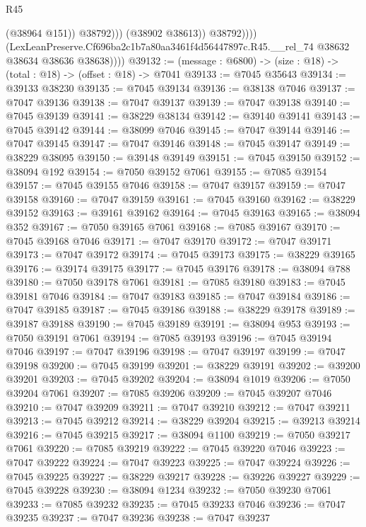 \begin{lexlean}{R45}
\begin{coremodule}
{                            (@38964 @151))
                          @38792)))
                    (@38902 @38613))
                  @38792))))
          (LexLeanPreserve.Cf696ba2c1b7a80aa3461f4d56447897c.R45.__rel_74
            @38632
            @38634
            @38636
            @38638))))
@39132 := (message : @6800) -> (size : @18) -> (total : @18) -> (offset : @18) -> @7041
@39133 := @7045 @35643
@39134 := @39133 @38230
@39135 := @7045 @39134
@39136 := @38138 @7046
@39137 := @7047 @39136
@39138 := @7047 @39137
@39139 := @7047 @39138
@39140 := @7045 @39139
@39141 := @38229 @38134
@39142 := @39140 @39141
@39143 := @7045 @39142
@39144 := @38099 @7046
@39145 := @7047 @39144
@39146 := @7047 @39145
@39147 := @7047 @39146
@39148 := @7045 @39147
@39149 := @38229 @38095
@39150 := @39148 @39149
@39151 := @7045 @39150
@39152 := @38094 @192
@39154 := @7050 @39152 @7061
@39155 := @7085 @39154
@39157 := @7045 @39155 @7046
@39158 := @7047 @39157
@39159 := @7047 @39158
@39160 := @7047 @39159
@39161 := @7045 @39160
@39162 := @38229 @39152
@39163 := @39161 @39162
@39164 := @7045 @39163
@39165 := @38094 @352
@39167 := @7050 @39165 @7061
@39168 := @7085 @39167
@39170 := @7045 @39168 @7046
@39171 := @7047 @39170
@39172 := @7047 @39171
@39173 := @7047 @39172
@39174 := @7045 @39173
@39175 := @38229 @39165
@39176 := @39174 @39175
@39177 := @7045 @39176
@39178 := @38094 @788
@39180 := @7050 @39178 @7061
@39181 := @7085 @39180
@39183 := @7045 @39181 @7046
@39184 := @7047 @39183
@39185 := @7047 @39184
@39186 := @7047 @39185
@39187 := @7045 @39186
@39188 := @38229 @39178
@39189 := @39187 @39188
@39190 := @7045 @39189
@39191 := @38094 @953
@39193 := @7050 @39191 @7061
@39194 := @7085 @39193
@39196 := @7045 @39194 @7046
@39197 := @7047 @39196
@39198 := @7047 @39197
@39199 := @7047 @39198
@39200 := @7045 @39199
@39201 := @38229 @39191
@39202 := @39200 @39201
@39203 := @7045 @39202
@39204 := @38094 @1019
@39206 := @7050 @39204 @7061
@39207 := @7085 @39206
@39209 := @7045 @39207 @7046
@39210 := @7047 @39209
@39211 := @7047 @39210
@39212 := @7047 @39211
@39213 := @7045 @39212
@39214 := @38229 @39204
@39215 := @39213 @39214
@39216 := @7045 @39215
@39217 := @38094 @1100
@39219 := @7050 @39217 @7061
@39220 := @7085 @39219
@39222 := @7045 @39220 @7046
@39223 := @7047 @39222
@39224 := @7047 @39223
@39225 := @7047 @39224
@39226 := @7045 @39225
@39227 := @38229 @39217
@39228 := @39226 @39227
@39229 := @7045 @39228
@39230 := @38094 @1234
@39232 := @7050 @39230 @7061
@39233 := @7085 @39232
@39235 := @7045 @39233 @7046
@39236 := @7047 @39235
@39237 := @7047 @39236
@39238 := @7047 @39237
}
\end{coremodule}
\end{lexlean}
